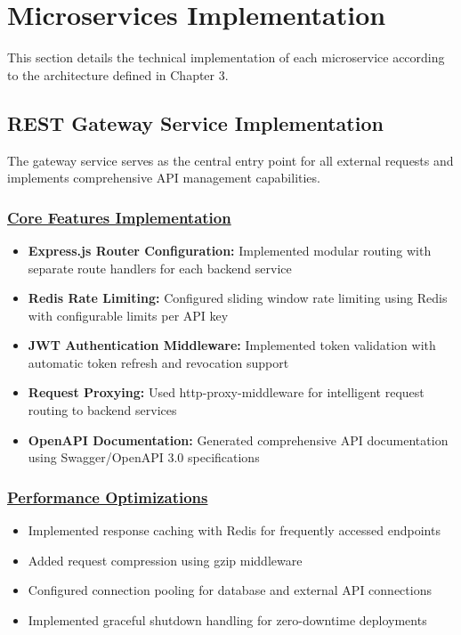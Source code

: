 \section{Microservices Implementation}
This section details the technical implementation of each microservice according to the architecture defined in Chapter 3.

\subsection{REST Gateway Service Implementation}
The gateway service serves as the central entry point for all external requests and implements comprehensive API management capabilities.

\subsubsection*{\underline{Core Features Implementation}}
\begin{itemize}
    \item \textbf{Express.js Router Configuration:} Implemented modular routing with separate route handlers for each backend service
    \item \textbf{Redis Rate Limiting:} Configured sliding window rate limiting using Redis with configurable limits per API key
    \item \textbf{JWT Authentication Middleware:} Implemented token validation with automatic token refresh and revocation support
    \item \textbf{Request Proxying:} Used http-proxy-middleware for intelligent request routing to backend services
    \item \textbf{OpenAPI Documentation:} Generated comprehensive API documentation using Swagger/OpenAPI 3.0 specifications
\end{itemize}

\subsubsection*{\underline{Performance Optimizations}}
\begin{itemize}
    \item Implemented response caching with Redis for frequently accessed endpoints
    \item Added request compression using gzip middleware
    \item Configured connection pooling for database and external API connections
    \item Implemented graceful shutdown handling for zero-downtime deployments
\end{itemize}


